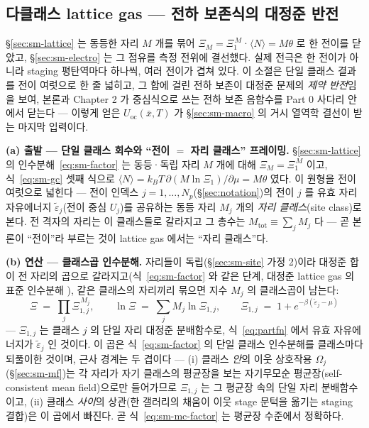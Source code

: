 \subsection{다클래스 lattice gas --- 전하 보존식의 대정준 반전}\label{sec:sm-mc}
\S\ref{sec:sm-lattice} 는 동등한 자리 $M$ 개를 묶어 $\Xi_M=\Xi_1^{\,M}$·$\langle N\rangle=M\theta$ 로 한 전이를
닫았고, \S\ref{sec:sm-electro} 는 그 점유를 측정 전위에 결선했다. 실제 전극은 한 전이가 아니라 staging
평탄역마다 하나씩, 여러 전이가 겹쳐 있다. 이 소절은 단일 클래스 결과를 전이 여럿으로 한 줄 넓히고, 그
합에 걸린 전하 보존이 대정준 문제의 \emph{제약 반전}임을 보여, 본론과 Chapter 2 가 중심식으로 쓰는 전하
보존 음함수를 Part 0 사다리 안에서 닫는다 --- 이렇게 얻은 $U_\mathrm{oc}(\bar x,T)$ 가 \S\ref{sec:sm-macro}
의 거시 열역학 결선이 받는 마지막 입력이다.

\textbf{(a) 출발 --- 단일 클래스 회수와 ``전이 $=$ 자리 클래스'' 프레이밍.} \S\ref{sec:sm-lattice} 의
인수분해~\eqref{eq:sm-factor} 는 동등·독립 자리 $M$ 개에 대해 $\Xi_M=\Xi_1^{\,M}$ 이고, 식~\eqref{eq:sm-gc}
셋째 식으로 $\langle N\rangle=k_BT\,\partial(M\ln\Xi_1)/\partial\mu=M\theta$ 였다. 이 원형을 전이 여럿으로
넓힌다 --- 전이 인덱스 $j=1,\dots,N_p$(\S\ref{sec:notation})의 전이 $j$ 를 유효 자리 자유에너지
$\tilde\varepsilon_j$(전이 중심 $U_j$)를 공유하는 동등 자리 $M_j$ 개의 \emph{자리 클래스}(site class)로 본다.
전 격자의 자리는 이 클래스들로 갈라지고 그 총수는 $M_\mathrm{tot}\equiv\sum_j M_j$ 다 --- 곧 본론이 ``전이''라
부르는 것이 lattice gas 에서는 ``자리 클래스''다.

\textbf{(b) 연산 --- 클래스곱 인수분해.} 자리들이 독립(\S\ref{sec:sm-site} 가정 2)이라 대정준 합이 전 자리의
곱으로 갈라지고(식~\eqref{eq:sm-factor} 와 같은 단계, 대정준 lattice gas 의 표준 인수분해 \cite{hill1960}),
같은 클래스의 자리끼리 묶으면 지수 $M_j$ 의 클래스곱이 남는다:
\begin{equation}
\Xi\;=\;\prod_{j} \Xi_{1,j}^{\,M_j},
\qquad
\ln\Xi\;=\;\sum_j M_j\ln\Xi_{1,j},
\qquad
\Xi_{1,j}\;=\;1+e^{-\beta(\tilde\varepsilon_j-\mu)}
\label{eq:sm-mc-factor}
\end{equation}
--- $\Xi_{1,j}$ 는 클래스 $j$ 의 단일 자리 대정준 분배함수로, 식~\eqref{eq:partfn} 에서 유효 자유에너지가
$\tilde\varepsilon_j$ 인 것이다. 이 곱은 식~\eqref{eq:sm-factor} 의 단일 클래스 인수분해를 클래스마다 되풀이한
것이며, 근사 경계는 두 겹이다 --- (i) 클래스 \emph{안}의 이웃 상호작용 $\Omega_j$(\S\ref{sec:sm-mf})는 각 자리가
자기 클래스의 평균장을 보는 자기무모순 평균장(self-consistent mean field)으로만 들어가므로 $\Xi_{1,j}$ 는 그
평균장 속의 단일 자리 분배함수이고, (ii) 클래스 \emph{사이}의 상관(한 갤러리의 채움이 이웃 stage 문턱을 옮기는
staging 결합)은 이 곱에서 빠진다. 곧 식~\eqref{eq:sm-mc-factor} 는 평균장 수준에서 정확하다.

